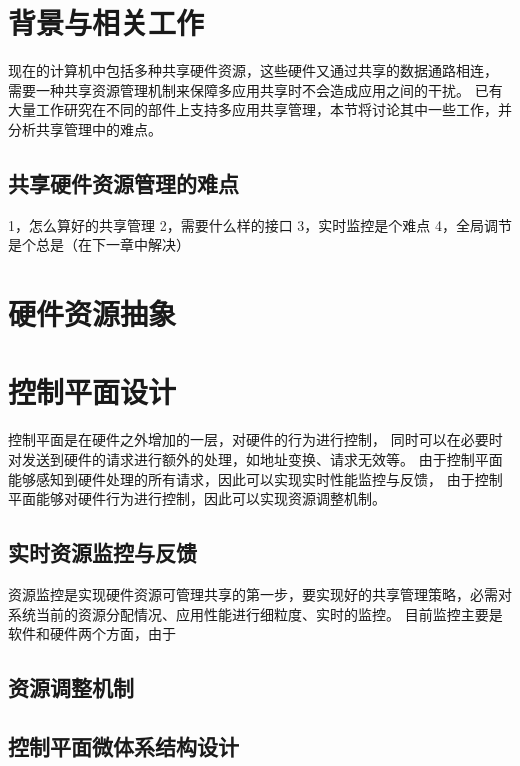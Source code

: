 

\section{背景与相关工作}

现在的计算机中包括多种共享硬件资源，这些硬件又通过共享的数据通路相连，
需要一种共享资源管理机制来保障多应用共享时不会造成应用之间的干扰。
已有大量工作研究在不同的部件上支持多应用共享管理，本节将讨论其中一些工作，并分析共享管理中的难点。


\subsection{共享硬件资源管理的难点}
1，怎么算好的共享管理
2，需要什么样的接口
3，实时监控是个难点
4，全局调节是个总是（在下一章中解决）

\section{硬件资源抽象}


\section{控制平面设计}

控制平面是在硬件之外增加的一层，对硬件的行为进行控制，
同时可以在必要时对发送到硬件的请求进行额外的处理，如地址变换、请求无效等。
由于控制平面能够感知到硬件处理的所有请求，因此可以实现实时性能监控与反馈，
由于控制平面能够对硬件行为进行控制，因此可以实现资源调整机制。

\subsection{实时资源监控与反馈}
资源监控是实现硬件资源可管理共享的第一步，要实现好的共享管理策略，必需对系统当前的资源分配情况、应用性能进行细粒度、实时的监控。
目前监控主要是软件和硬件两个方面，由于


\subsection{资源调整机制}

\subsection{控制平面微体系结构设计}

